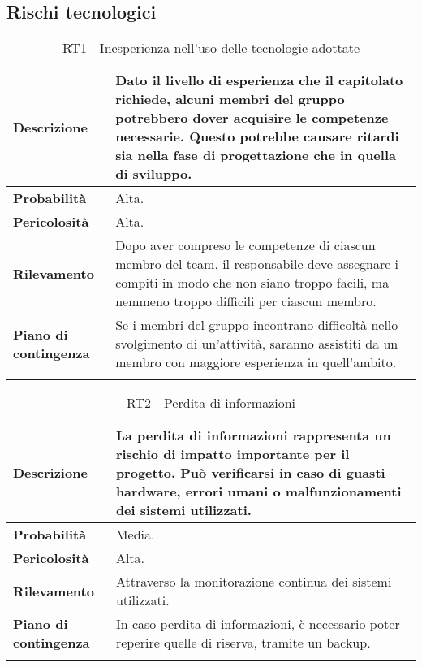 \newpage


\subsection{Rischi tecnologici}
\begin{longtable}{ | l | p{10cm} | }
    \hline
    \textbf{Descrizione} & Dato il livello di esperienza che il capitolato richiede,  alcuni membri del gruppo potrebbero dover acquisire le competenze necessarie. Questo potrebbe causare ritardi sia nella fase di progettazione che in quella di sviluppo.  \\
    \hline
    \textbf{Probabilità} & Alta. \\
    \hline
    \textbf{Pericolosità} & Alta. \\
    \hline
    \textbf{Rilevamento} & Dopo aver compreso le competenze di ciascun membro del team, il responsabile deve assegnare i compiti in modo che non siano troppo facili, ma nemmeno troppo difficili per ciascun membro. \\
    \hline
    \textbf{Piano di contingenza} & Se i membri del gruppo incontrano difficoltà nello svolgimento di un'attività, saranno assistiti da un membro con maggiore esperienza in quell'ambito. \\
    \hline
    \caption{RT1 - Inesperienza nell'uso delle tecnologie adottate}
    \label{table:5}
\end{longtable}

\begin{longtable}{ | l | p{10cm} | }
    \hline
    \textbf{Descrizione} & La perdita di informazioni rappresenta un rischio di impatto importante per il progetto. Può verificarsi in caso di guasti hardware, errori umani o malfunzionamenti dei sistemi utilizzati. \\
    \hline
    \textbf{Probabilità} & Media. \\
    \hline
    \textbf{Pericolosità} & Alta. \\
    \hline
    \textbf{Rilevamento} & Attraverso la monitorazione continua dei sistemi utilizzati. \\
    \hline
    \textbf{Piano di contingenza} & In caso perdita di informazioni, è necessario poter reperire quelle di riserva, tramite un backup. \\
    \hline
    \caption{RT2 - Perdita di informazioni}
    \label{table:6}
\end{longtable}

